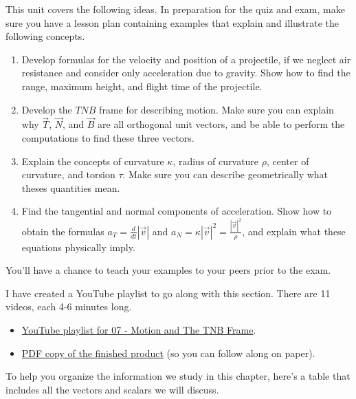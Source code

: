 
\noindent 
This unit covers the following ideas. In preparation for the quiz and exam, make sure you have a lesson plan containing examples that explain and illustrate the following concepts.  
\begin{enumerate}
 \item Develop formulas for the velocity and position of a projectile, if we neglect air resistance and consider only acceleration due to gravity. Show how to find the range, maximum height, and flight time of the projectile.
 \item Develop the $TNB$ frame for describing motion. Make sure you can explain why $\vec T$, $\vec N$, and $\vec B$ are all orthogonal unit vectors, and be able to perform the computations to find these three vectors.
 \item Explain the concepts of curvature $\kappa$, radius of curvature $\rho$, center of curvature, and torsion $\tau$. Make sure you can describe geometrically what theses quantities mean.
 \item Find the tangential and normal components of acceleration. Show how to obtain the formulas $a_T=\frac{d}{dt}|\vec v|$ and $a_N=\kappa |\vec v|^2=\frac{|\vec v|^2}{\rho}$, and explain what these equations physically imply.
\end{enumerate}
You'll have a chance to teach your examples to your peers prior to the exam.

I have created a YouTube playlist to go along with this section. There are 11 videos, each 4-6 minutes long.
\begin{itemize}
 \item \href{http://www.youtube.com/playlist?list=PL30EE81142B1ED1F0&feature=plcp}{YouTube playlist for 07 - Motion and The TNB Frame}.
 \item \href{http://db.tt/FmEGk9p5}{PDF copy of the finished product} (so you can follow along on paper).
\end{itemize}


To help you organize the information we study in this chapter, here's a table that includes all the vectors and scalars we will discuss.

